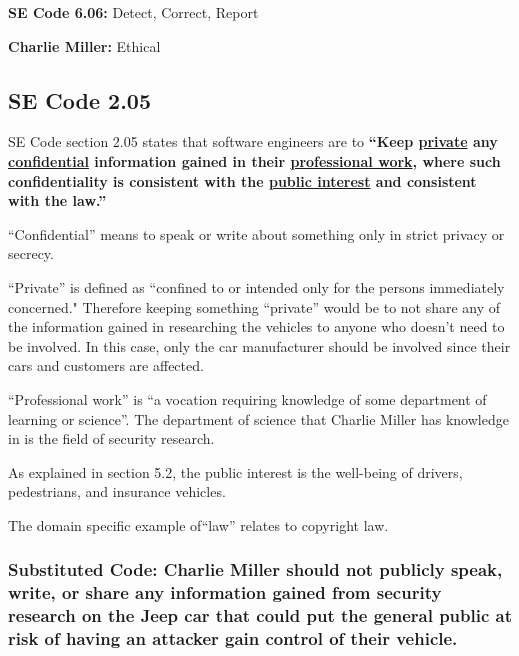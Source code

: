 \documentclass[12pt]{article}
\begin{document}
\begin{multicols}{2}
\begin{framed}
\hspace{-.67cm}\textbf{SE Code 6.06:} Detect, Correct, Report 

\hspace{-.67cm}\textbf{Charlie Miller:} Ethical
\end{framed}


\subsection{SE Code 2.05}

SE Code section 2.05 states that software engineers are to \textbf{``Keep \underline{private} any \underline{confidential} information gained in their \underline{professional work}, where such confidentiality is consistent with the \underline{public interest} and consistent with the law.''}\cite{seCode}

``Confidential'' means to speak or write about something only in strict privacy or secrecy.\cite{dictionary}

``Private'' is defined as ``confined to or intended only for the persons immediately concerned."\cite{dictionary} Therefore keeping something ``private'' would be to not share any of the information gained in researching the vehicles to anyone who doesn't need to be involved. In this case, only the car manufacturer should be involved since their cars and customers are affected. 

``Professional work'' is ``a vocation requiring knowledge of some department of learning or science''\cite{dictionary}. The department of science that Charlie Miller has knowledge in is the field of security research. 

As explained in section 5.2, the public interest is the well-being of drivers, pedestrians, and insurance vehicles.

The domain specific example of``law'' relates to copyright law. %


\subsubsection{Substituted Code: Charlie Miller should not publicly speak, write, or share any information gained from security research on the Jeep car that could put the general public at risk of having an attacker gain control of their vehicle.}


\end{multicols}
\end{document}
